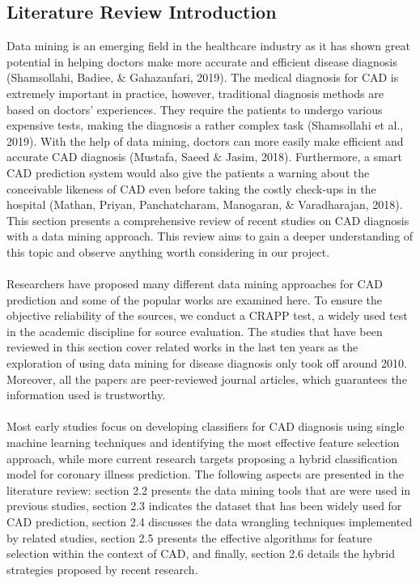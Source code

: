 \documentclass[a4paper, 12pt]{article}
\begin{document}
    \subsection{Literature Review Introduction}
    Data mining is an emerging field in the healthcare industry as it has shown great potential in helping doctors make more accurate and efficient disease diagnosis (Shamsollahi, Badiee, \& Gahazanfari, 2019). The medical diagnosis for CAD is extremely important in practice, however, traditional diagnosis methods are based on doctors’ experiences. They require the patients to undergo various expensive tests, making the diagnosis a rather complex task (Shamsollahi et al., 2019). With the help of data mining, doctors can more easily make efficient and accurate CAD diagnosis (Mustafa, Saeed \& Jasim, 2018). Furthermore, a smart CAD prediction system would also give the patients a warning about the conceivable likeness of CAD even before taking the costly check-ups in the hospital (Mathan, Priyan, Panchatcharam, Manogaran, \& Varadharajan, 2018). This section presents a comprehensive review of recent studies on CAD diagnosis with a data mining approach. This review aims to gain a deeper understanding of this topic and observe anything worth considering in our project.\\\\
    Researchers have proposed many different data mining approaches for CAD prediction and some of the popular works are examined here. To ensure the objective reliability of the sources, we conduct a CRAPP test, a widely used test in the academic discipline for source evaluation. The studies that have been reviewed in this section cover related works in the last ten years as the exploration of using data mining for disease diagnosis only took off around 2010. Moreover, all the papers are peer-reviewed journal articles, which guarantees the information used is trustworthy.\\\\
    Most early studies focus on developing classifiers for CAD diagnosis using single machine learning techniques and identifying the most effective feature selection approach, while more current research targets proposing a hybrid classification model for coronary illness prediction. The following aspects are presented in the literature review: section 2.2 presents the data mining tools that are were used in previous studies, section 2.3 indicates the dataset that has been widely used for CAD prediction, section 2.4 discusses the data wrangling techniques implemented by related studies, section 2.5 presents the effective algorithms for feature selection within the context of CAD, and finally, section 2.6 details the hybrid strategies proposed by recent research.
\end{document}
